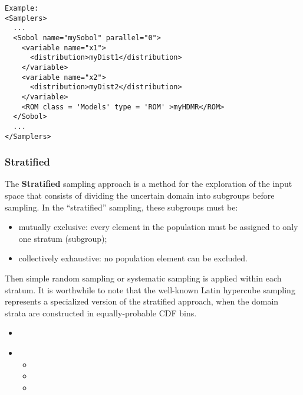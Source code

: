 
\footnotesize
\begin{lstlisting}[style=XML]
Example:
<Samplers>
  ...
  <Sobol name="mySobol" parallel="0">
    <variable name="x1">
      <distribution>myDist1</distribution>
    </variable>
    <variable name="x2">
      <distribution>myDist2</distribution>
    </variable>
    <ROM class = 'Models' type = 'ROM' >myHDMR</ROM>
  </Sobol>
  ...
</Samplers>
\end{lstlisting}
 \normalsize

\subsubsection{Stratified}
\label{subsubsubsec:Stratified}
The \textbf{Stratified} sampling approach is a method for the exploration of the
input space that consists of dividing the uncertain domain into subgroups before
sampling.
%
In the ``stratified'' sampling, these subgroups must be:
\begin{itemize}
 \item mutually exclusive: every element in the population must be assigned to
   only one stratum (subgroup);
 \item collectively exhaustive: no population element can be excluded.
\end{itemize}

Then simple random sampling or systematic sampling is applied within each
stratum.
%
It is worthwhile to note that the well-known Latin hypercube sampling represents
a specialized version of the stratified approach, when the domain strata are
constructed in equally-probable CDF bins.

%
\attrIntro
\begin{itemize}
\itemsep0em
\item \nameDescription
\end{itemize}
\begin{itemize}
\item \variableDescription
 \variableChildrenIntro
 \begin{itemize}
    \item \distributionDescription
    \item \functionDescription
    \item \gridDescription
  \end{itemize}
\end{itemize}

